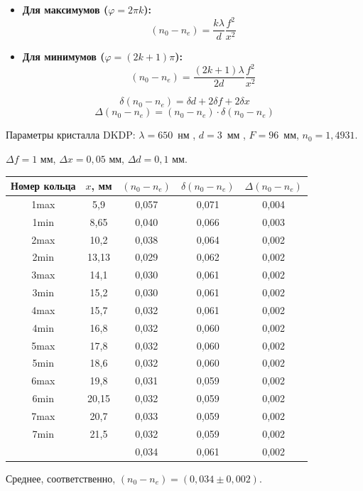 \documentclass[a4paper,12pt]{article}
\begin{document}
\begin{itemize}
    \item \textbf{Для максимумов ($\varphi = 2\pi k$):} 
    \begin{equation}
    (n_0 - n_e) = \frac{k \lambda}{d} \frac{f^2}{x^2}
    \end{equation}
    
    \item \textbf{Для минимумов ($\varphi = (2k + 1)\pi$):} 
    \begin{equation}
    (n_0 - n_e) = \frac{(2k + 1) \lambda}{2d} \frac{f^2}{x^2}
    \end{equation}
\end{itemize}

\begin{equation}
\delta(n_0 - n_e) = \delta d + 2\delta f + 2\delta x
\end{equation}
\begin{equation}
\Delta(n_0 - n_e) = (n_0 - n_e) \cdot \delta(n_0 - n_e)
\end{equation}

Параметры кристалла DKDP: $\lambda = 650$~нм , $d = 3$~мм , $F = 96$~мм, $n_0 = 1,4931$.

$\Delta f = 1$ мм, $\Delta x = 0,05$ мм, $\Delta d = 0,1$ мм.   

\begin{table}[h!]
\centering
\begin{tabular}{ccccc}
\toprule
Номер кольца & $x$, мм & $(n_0 - n_e)$ & $\delta (n_0 - n_e)$ & $\Delta (n_0 - n_e)$ \\
\midrule
1max & 5,9  & 0,057 & 0,071 & 0,004 \\
1min & 8,65 & 0,040 & 0,066 & 0,003 \\
2max & 10,2 & 0,038 & 0,064 & 0,002 \\
2min & 13,13& 0,029 & 0,062 & 0,002 \\
3max & 14,1 & 0,030 & 0,061 & 0,002 \\
3min & 15,2 & 0,030 & 0,061 & 0,002 \\
4max & 15,7 & 0,032 & 0,061 & 0,002 \\
4min & 16,8 & 0,032 & 0,060 & 0,002 \\
5max & 17,8 & 0,032 & 0,060 & 0,002 \\
5min & 18,6 & 0,032 & 0,060 & 0,002 \\
6max & 19,8 & 0,031 & 0,059 & 0,002 \\
6min & 20,15& 0,032 & 0,059 & 0,002 \\
7max & 20,7 & 0,033 & 0,059 & 0,002 \\
7min & 21,5 & 0,032 & 0,059 & 0,002 \\
\midrule
 & & 0,034 & 0,061 & 0,002 \\
\bottomrule
\end{tabular}
\end{table}

Среднее, соответственно, $(n_0 - n_e) = (0,034 \pm 0,002)$.
\end{document}
